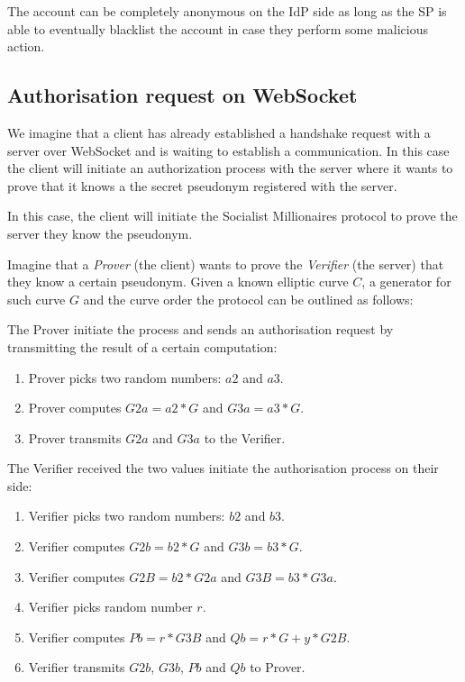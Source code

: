 The account can be completely anonymous on the IdP side as long as the SP is able to eventually blacklist the account in case they perform some malicious action.
 
\subsection{Authorisation request on WebSocket}

We imagine that a client has already established a handshake request with a server over WebSocket and is waiting to establish a communication. In this case the client will initiate an authorization process with the server where it wants to prove that it knows a the secret pseudonym registered with the server.

In this case, the client will initiate the Socialist Millionaires protocol to prove the server they know the pseudonym.

Imagine that a \emph{Prover} (the client) wants to prove the \emph{Verifier} (the server) that they know a certain pseudonym. Given a known elliptic curve $C$, a generator for such curve $G$ and the curve order the protocol can be outlined as follows:

The Prover initiate the process and sends an authorisation request by transmitting the result of a certain computation:
\begin{enumerate}
    \item Prover picks two random numbers: $a2$ and $a3$.
    \item Prover computes $G2a = a2 * G$ and $G3a = a3 * G$.
    \item Prover transmits $G2a$ and $G3a$ to the Verifier.
\end{enumerate}

The Verifier received the two values initiate the authorisation process on their side:
\begin{enumerate}
    \item Verifier picks two random numbers: $b2$ and $b3$. 
    \item Verifier computes $G2b = b2 * G$ and $G3b = b3 * G$.
    \item Verifier computes $G2B = b2 * G2a$ and $G3B = b3 * G3a$.
    \item Verifier picks random number $r$.
    \item Verifier computes $Pb = r * G3B$ and $Qb = r * G + y * G2B$.
    \item Verifier transmits $G2b$, $G3b$, $Pb$ and $Qb$ to Prover.
\end{enumerate}

